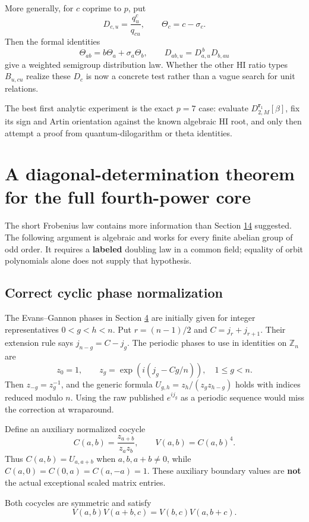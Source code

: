 \documentclass[11pt,reqno]{amsart}
\theoremstyle{plain}
\begin{document}
More generally, for \(c\) coprime to \(p\), put
\[
D_{c,u}=\frac{q_u^c}{q_{cu}},
\qquad
\Theta_c=c-\sigma_c.
\]
Then the formal identities
\[
\Theta_{ab}=b\Theta_a+\sigma_a\Theta_b,
\qquad
D_{ab,u}=D_{a,u}^{\,b}D_{b,au}
\]
give a weighted semigroup distribution law. Whether the other HI ratio types \(B_{u,cu}\) realize these \(D_c\) is now a concrete test rather than a vague search for unit relations.

The best first analytic experiment is the exact \(p=7\) case: evaluate \(D_{2,M}^{\mathbf r_1}[\beta]\), fix its sign and Artin orientation against the known algebraic HI root, and only then attempt a proof from quantum-dilogarithm or theta identities.

\section{A diagonal-determination theorem for the full fourth-power core}\label{sec:28}

The short Frobenius law contains more information than Section \hyperref[sec:14]{14} suggested.
The following argument is algebraic and works for every finite abelian group
of odd order. It requires a \textbf{labeled} doubling law in a common field;
equality of orbit polynomials alone does not supply that hypothesis.

\subsection{Correct cyclic phase normalization}\label{sec:28.1}

The Evans--Gannon phases in Section \hyperref[sec:4]{4} are initially given for integer
representatives \(0<g<h<n\). Put \(r=(n-1)/2\) and
\(C=j_r+j_{r+1}\). Their extension rule says \(j_{n-g}=C-j_g\).
The periodic phases to use in identities on \(\mathbb Z_n\) are
\[
 z_0=1,\qquad z_g=\exp\!\left(i(j_g-Cg/n)\right),\quad 1\le g<n.
\]
Then \(z_{-g}=z_g^{-1}\), and the generic formula
\(U_{g,h}=z_h/(z_gz_{h-g})\) holds with indices reduced modulo \(n\).
Using the raw published \(e^{ij_g}\) as a periodic sequence would miss
the correction at wraparound.

Define an auxiliary normalized cocycle
\[
 C(a,b)=\frac{z_{a+b}}{z_az_b},\qquad V(a,b)=C(a,b)^4.
\]
Thus \(C(a,b)=U_{a,a+b}\) when \(a,b,a+b\ne0\), while
\(C(a,0)=C(0,a)=C(a,-a)=1\). These auxiliary boundary values are
\textbf{not} the actual exceptional scaled matrix entries.

Both cocycles are symmetric and satisfy
\[
 V(a,b)V(a+b,c)=V(b,c)V(a,b+c).
\]
\end{document}
